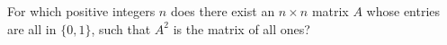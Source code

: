 For which positive integers \(n\) does there exist an \(n \times n\) matrix \(A\) whose entries are all in \(\{0, 1\}\), such that \(A^2\) is the matrix of all ones?
